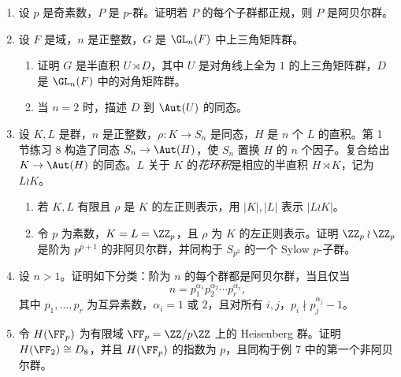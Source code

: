 \begin{enumerate}[label=\arabic*.]
  \item 设 $p$ 是奇素数，$P$ 是 $p$-群。证明若 $P$ 的每个子群都正规，则 $P$ 是阿贝尔群。
  \item 设 $F$ 是域，$n$ 是正整数，$G$ 是 $\GL_n(F)$ 中上三角矩阵群。
  \begin{enumerate}[label=(\alph*)]
    \item 证明 $G$ 是半直积 $U\rtimes D$，其中 $U$ 是对角线上全为 $1$ 的上三角矩阵群，$D$ 是 $\GL_n(F)$ 中的对角矩阵群。
    \item 当 $n=2$ 时，描述 $D$ 到 $\Aut(U)$ 的同态。
  \end{enumerate}
  \item 设 $K,L$ 是群，$n$ 是正整数，$\rho:K\to S_n$ 是同态，$H$ 是 $n$ 个 $L$ 的直积。第 1 节练习 8 构造了同态 $S_n\to\Aut(H)$，使 $S_n$ 置换 $H$ 的 $n$ 个因子。复合给出 $K\to\Aut(H)$ 的同态。$L$ 关于 $K$ 的\emph{花环积}是相应的半直积 $H\rtimes K$，记为 $L\wr K$。
  \begin{enumerate}[label=(\alph*)]
    \item 若 $K,L$ 有限且 $\rho$ 是 $K$ 的左正则表示，用 $|K|,|L|$ 表示 $|L\wr K|$。
    \item 令 $p$ 为素数，$K=L=\ZZ_p$，且 $\rho$ 为 $K$ 的左正则表示。证明 $\ZZ_p\wr\ZZ_p$ 是阶为 $p^{p+1}$ 的非阿贝尔群，并同构于 $S_{p^2}$ 的一个 Sylow $p$-子群。
  \end{enumerate}
  \item 设 $n>1$。证明如下分类：阶为 $n$ 的每个群都是阿贝尔群，当且仅当
  \[
    n=p_1^{\alpha_1}p_2^{\alpha_2}\cdots p_r^{\alpha_r},
  \]
  其中 $p_1,
\ldots,p_r$ 为互异素数，$\alpha_i=1$ 或 $2$，且对所有 $i,j$，$p_i\nmid p_j^{\alpha_j}-1$。
  \item 令 $H(\FF_p)$ 为有限域 $\FF_p=\ZZ/p\ZZ$ 上的 Heisenberg 群。证明 $H(\FF_2)\cong D_8$，并且 $H(\FF_p)$ 的指数为 $p$，且同构于例 7 中的第一个非阿贝尔群。
\end{enumerate}